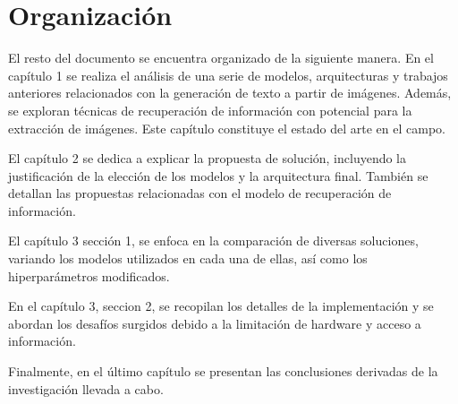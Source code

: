 \section*{Organizaci\'on}
El resto del documento se encuentra organizado de la siguiente manera. En el cap\'itulo 1 se realiza el an\'alisis de una serie de modelos, arquitecturas y trabajos anteriores relacionados con la generaci\'on de texto a partir de im\'agenes. Adem\'as, se exploran t\'ecnicas de recuperaci\'on de informaci\'on con potencial para la extracci\'on de im\'agenes. Este cap\'itulo constituye el estado del arte en el campo.

El cap\'itulo 2 se dedica a explicar la propuesta de soluci\'on, incluyendo la justificaci\'on de la elecci\'on de los modelos y la arquitectura final. Tambi\'en se detallan las propuestas relacionadas con el modelo de recuperaci\'on de informaci\'on.

El cap\'itulo 3 secci\'on 1, se enfoca en la comparaci\'on de diversas soluciones, variando los modelos utilizados en cada una de ellas, as\'i como los hiperpar\'ametros modificados.

En el cap\'itulo 3, seccion 2, se recopilan los detalles de la implementaci\'on y se abordan los desaf\'ios surgidos debido a la limitaci\'on de hardware y acceso a informaci\'on.

Finalmente, en el \'ultimo cap\'itulo se presentan las conclusiones derivadas de la investigaci\'on llevada a cabo.

